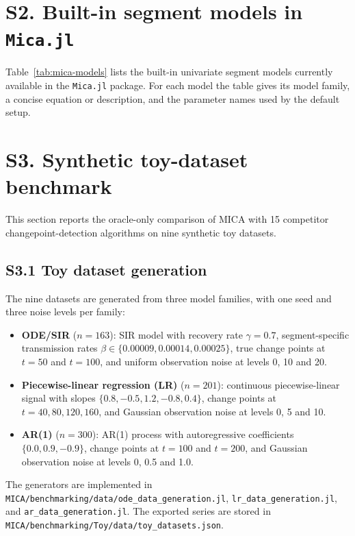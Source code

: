 \documentclass[11pt,a4paper]{article}
\begin{document}
\section*{S2. Built-in segment models in \texttt{Mica.jl}}

Table~\ref{tab:mica-models} lists the built-in univariate segment models currently available in the \texttt{Mica.jl} package. For each model the table gives its model family, a concise equation or description, and the parameter names used by the default setup.



\section*{S3. Synthetic toy-dataset benchmark}

This section reports the oracle-only comparison of MICA with 15 competitor changepoint-detection algorithms on nine synthetic toy datasets.

\subsection*{S3.1 Toy dataset generation}

The nine datasets are generated from three model families, with one seed and three noise levels per family:
\begin{itemize}
    \item \textbf{ODE/SIR} ($n=163$): SIR model with recovery rate $\gamma=0.7$, segment-specific transmission rates $\beta\in\{0.00009,0.00014,0.00025\}$, true change points at $t=50$ and $t=100$, and uniform observation noise at levels 0, 10 and 20.
    \item \textbf{Piecewise-linear regression (LR)} ($n=201$): continuous piecewise-linear signal with slopes $\{0.8,-0.5,1.2,-0.8,0.4\}$, change points at $t=40,80,120,160$, and Gaussian observation noise at levels 0, 5 and 10.
    \item \textbf{AR(1)} ($n=300$): AR(1) process with autoregressive coefficients $\{0.0,0.9,-0.9\}$, change points at $t=100$ and $t=200$, and Gaussian observation noise at levels 0, 0.5 and 1.0.
\end{itemize}

The generators are implemented in \texttt{MICA/benchmarking/data/ode\_data\_generation.jl}, \texttt{lr\_data\_generation.jl}, and \texttt{ar\_data\_generation.jl}. The exported series are stored in \texttt{MICA/benchmarking/Toy/data/toy\_datasets.json}.
\end{document}
